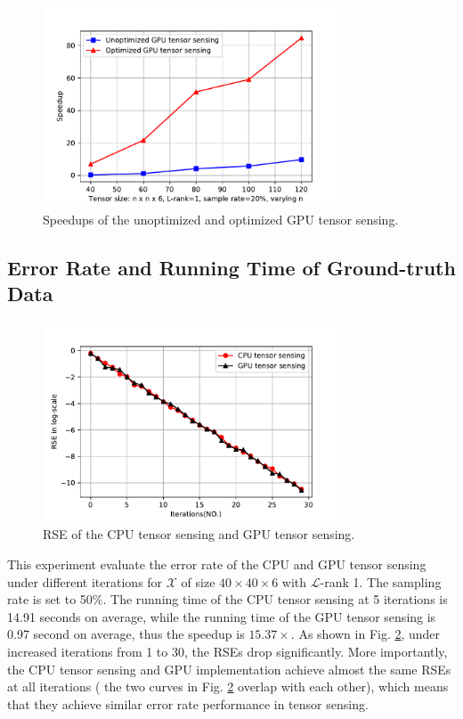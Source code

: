 \documentclass[futureinternet,article,submit,moreauthors,pdftex,10pt,a4paper]{Definitions/mdpi}
\theoremstyle{plain}
\theoremstyle{definition}
\theoremstyle{remark}
\begin{document}
\begin{figure}[t]
    \centering
    \includegraphics[width=3.5in]{speedup.pdf}
    \caption{Speedups of the unoptimized and optimized GPU tensor sensing.}
    \label{pic:runtime}
\end{figure}

\subsection{Error Rate and Running Time of Ground-truth Data}
\begin{figure}[t]
    \centering
    \includegraphics[width=3.5in]{rse.pdf}
    \caption{RSE of the CPU tensor sensing and GPU tensor sensing.}
    \label{pic:rse}
\end{figure}

This experiment evaluate the error rate of the CPU and GPU tensor sensing under different iterations for $\mathcal{X}$ of size $40 \times 40 \times 6$ with $\mathcal{L}$-rank 1. The sampling rate is set to 50\%. The running time of the CPU tensor sensing at 5 iterations is 14.91 seconds on average, while the running time of the GPU tensor sensing is 0.97 second on average, thus the speedup is $15.37 \times$. As shown in Fig. \ref{pic:rse}, under increased iterations from 1 to 30, the RSEs drop significantly. More importantly, the CPU tensor sensing and GPU implementation achieve almost the same RSEs at all iterations ( the two curves in Fig. \ref{pic:rse} overlap with each other), which means that they achieve similar error rate performance in tensor sensing.
\end{document}
